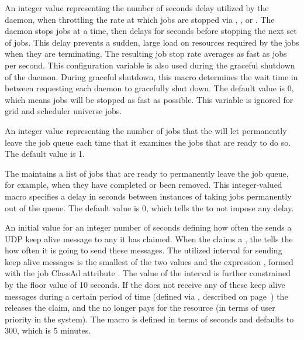\begin{description}
\label{param:JobStopDelay}
\item[\Macro{JOB\_STOP\_DELAY}]
  An integer value representing the number of seconds delay utilized by
  the  daemon, when throttling the rate at which jobs
  are stopped via , , or .  
  The   daemon stops
   jobs at a time, then delays for
   seconds before stopping the next set of jobs.
  This delay prevents a sudden, large load on resources required by
  the jobs when they are terminating.
  The resulting job stop rate averages as fast as
   jobs per second.
  This configuration variable is also used during the graceful shutdown of the
   daemon.
  During graceful shutdown, this macro determines the wait time in
  between requesting each  daemon to gracefully shut down.  
  The default value is 0, which means jobs will be stopped as fast as possible.
  This variable is ignored for grid and scheduler universe jobs.

\label{param:JobIsFinishedCount}
\item[\Macro{JOB\_IS\_FINISHED\_COUNT}]
  An integer value representing the number of jobs that the 
  will let permanently leave the job queue each time that it examines the
  jobs that are ready to do so.
  The default value is 1.

\label{param:JobIsFinishedInterval}
\item[\Macro{JOB\_IS\_FINISHED\_INTERVAL}]
  The  maintains a list of jobs that are ready to permanently
  leave the job queue, for example, when they have completed or been removed.
  This integer-valued macro specifies a delay in seconds between instances
  of taking jobs permanently out of the queue.  
  The default value is 0, 
  which tells the  to not impose any delay.  
  
\label{param:AliveInterval}
\item[\Macro{ALIVE\_INTERVAL}]
  An initial value for an integer number of seconds defining
  how often the  sends a UDP keep
  alive message to any  it has claimed.
  When the  claims a , 
  the  tells the  how often it is
  going to send these messages.
  The utilized interval for sending keep alive messages is the smallest of
  the two values  and the expression
  , formed with the job ClassAd attribute
  .
  The value of the interval is further constrained by the floor value 
  of 10 seconds.
  If the  does not receive any of these keep alive messages
  during a certain period of time (defined via
  , described on
  page~\pageref{param:MaxClaimAlivesMissed})
  the  releases the claim, and the  no longer pays for
  the resource (in terms of user priority in the system).
  The macro is defined in terms of seconds and defaults to 300, which is
  5 minutes.


\end{description}
